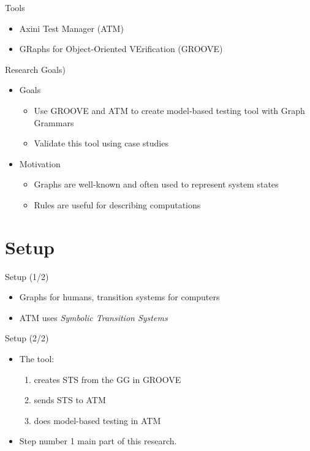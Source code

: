 \documentclass{FMTslides}
\begin{document}
\begin{frame}{Tools}
\begin{itemize}[<+->]
\item Axini Test Manager (ATM)
\item GRaphs for Object-Oriented VErification (GROOVE)
\end{itemize}
\end{frame}

\begin{frame}{Research Goals)}
\begin{itemize}[<+->]
  \item Goals
  \begin{itemize}
    \item Use GROOVE and ATM to create model-based testing tool with Graph Grammars
    \item Validate this tool using case studies
  \end{itemize}
  \item Motivation
  \begin{itemize}
    \item Graphs are well-known and often used to represent system states
    \item Rules are useful for describing computations
  \end{itemize}
\end{itemize}
\end{frame}

\makecontentsslide

\section[Setup]{Setup}

\begin{frame}{Setup (1/2)}
\begin{itemize}[<+->]
  \item Graphs for humans, transition systems for computers
  \item ATM uses \textit{Symbolic Transition Systems}
\end{itemize}
\begin{figure}

\end{figure}
\end{frame}

\begin{frame}{Setup (2/2)}
\begin{itemize}[<+->]
  \item The tool:
  \begin{enumerate}
    \item creates STS from the GG in GROOVE
    \item sends STS to ATM
    \item does model-based testing in ATM
  \end{enumerate}
  \item Step number 1 main part of this research.
\end{itemize}
\end{frame}
\end{document}
